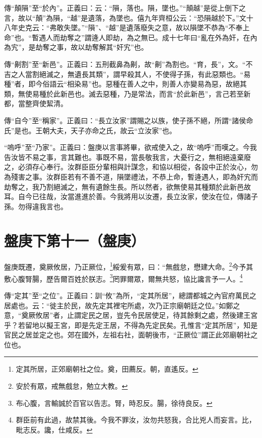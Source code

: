 {\noindent\zhuan{}\fzbyks 傳“顛隕”至“於內”。正義曰：云：“隕，落也。隕，墜也。”“顛越”是從上倒下之言，故以“顛”為隕，“越”是遺落，為墜也。僖九年齊桓公云：“恐隕越於下。”文十八年史克云：“弗敢失墜。”“隕”、“越”是遺落廢失之意，故以隕墜不恭為“不奉上命”也。“暫遇人而劫奪之”謂逄人即劫，為之無已。成十七年曰“亂在外為奸，在內為宄”，是劫奪之事，故以劫奪解其“奸宄”也。 \par}

{\noindent\zhuan{}\fzbyks 傳“劓割”至“新邑”。正義曰：五刑截鼻為劓，故“劓”為割也。“育，長”，文。“不吉之人當割絕滅之，無遺長其類”，謂早殺其人，不使得子孫，有此惡類也。“易種”者，即今俗語云“相染易”也。惡種在善人之中，則善人亦變易為惡，故絕其類，無使易種於此新邑也。滅去惡種，乃是常法，而言“於此新邑”，言己若至新都，當整齊使絜清。 \par}

{\noindent\zhuan{}\fzbyks 傳“自今”至“稱家”。正義曰：“長立汝家”謂賜之以族，使子孫不絕，所謂“諸侯命氏”是也。王朝大夫，天子亦命之氏，故云“立汝家”也。 \par}

{\noindent\shu{}\fzkt “嗚呼”至“乃家”。正義曰：盤庚以言事將畢，欲戒使入之，故“嗚呼”而嘆之。今我告汝皆不易之事，言其難也。事既不易，當長敬我言，大憂行之，無相絕遠棄廢之，必須存心奉行。汝群臣臣分輩相與計謀念，和協以相從，各設中正於汝心，勿為殘害之事。汝群臣若有不善不道，隕墜禮法，不恭上命，暫逄遇人，即為奸宄而劫奪之，我乃割絕滅之，無有遺餘生長。所以然者，欲無使易其種類於此新邑故耳。自今已往哉，汝當進進於善。今我將用以汝遷，長立汝家，使汝在位，傳諸子孫。勿得違我言也。 \par}

\section{盤庚下第十一（盤庚）}

盤庚既遷，奠厥攸居，乃正厥位，\footnote{定其所居，正郊廟朝社之位。奠，田薦反。朝，直遙反。}綏爰有眾，曰：“無戲怠，懋建大命。\footnote{安於有眾，戒無戲怠，勉立大教。}今予其敷心腹腎腸，歷告爾百姓於朕志。\footnote{布心腹，言輸誠於百官以告志。腎，時忍反。腸，徐待良反。}罔罪爾眾，爾無共怒，協比讒言予一人。\footnote{群臣前有此過，故禁其後。今我不罪汝，汝勿共怒我，合比兇人而妄言。比，毗志反。讒，仕咸反。}

{\noindent\zhuan{}\fzbyks 傳“定其”至“之位”。正義曰：訓“攸”為所，“定其所居”，總謂都城之內官府萬民之居處也。云：“徙主於民，故先定其裡宅所處，次乃正宗廟朝廷之位。”如鄭之意，“奠厥攸居”者，止謂定民之居，豈先令民居使足，待其餘剩之處，然後建王宮乎？若留地以擬王宮，即是先定王居，不得為先定民矣。孔惟言“定其所居”，知是官民之居並定之也。郊在國外，左祖右社，面朝後市，“正厥位”謂正此郊廟朝社之位也。 \par}

